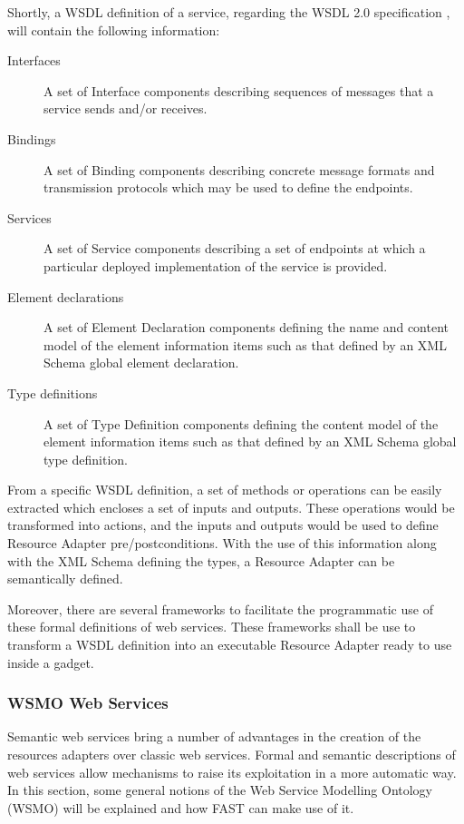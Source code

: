 \documentclass{fast_latex}
\begin{document}
Shortly, a WSDL definition of a service, regarding the WSDL 2.0 specification \cite{WSDL2.0}, will contain the following information:
\begin{description}
	\item[Interfaces] A set of Interface components describing sequences of messages that a service sends and/or receives.
	\item[Bindings] A set of Binding components describing concrete message formats and transmission protocols which may be used to define the endpoints.
	\item[Services] A set of Service components describing a set of endpoints at which a particular deployed implementation of the service is provided.
	\item[Element declarations] A set of Element Declaration components defining the name and content model of the element information items such as that defined by an XML Schema global element declaration.
	\item[Type definitions] A set of Type Definition components defining the content model of the element information items such as that defined by an XML Schema global type definition.
\end{description}

From a specific WSDL definition, a set of methods or operations can be easily extracted which encloses a set of inputs and outputs. These operations would be transformed into actions, and the inputs and outputs would be used to define Resource Adapter pre/postconditions. With the use of this information along with the XML Schema defining the types, a Resource Adapter can be semantically defined.

Moreover, there are several frameworks to facilitate the programmatic use of these formal definitions of web services. These frameworks shall be use to transform a WSDL definition into an executable Resource Adapter ready to use inside a gadget.


\subsubsection{WSMO Web Services} %
\label{ssub:wsmo_web_services}

Semantic web services bring a number of advantages in the creation of the resources adapters over classic web services. Formal and semantic descriptions of web services allow mechanisms to raise its exploitation in a more automatic way. In this section, some general notions of the Web Service Modelling Ontology (WSMO) will be explained and how FAST can make use of it.
\end{document}
